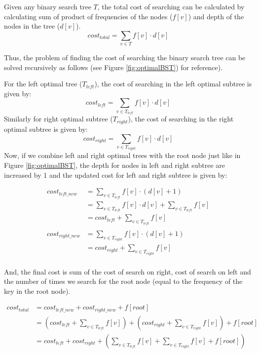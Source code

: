 \documentclass[11pt]{article}
\theoremstyle{definition}
\begin{document}
    Given any binary search tree $T$, the total cost of searching can be calculated by calculating sum of product of frequencies of the nodes ($f[v]$) and depth of the nodes in the tree ($d[v]$).
    \begin{equation}
        cost_{total} = \sum_{v \in T} f[v]\cdot d[v]
    \end{equation}
    
    Thus, the problem of finding the cost of searching the binary search tree can be solved recursively as follows (see Figure \ref{fig:optimalBST}) for reference).

For the left optimal tree ($T_{left}$), the cost of searching in the left optimal subtree is given by: 
    \begin{equation}
        cost_{left} = \sum_{v \in T_{left}} f[v]\cdot d[v]
    \end{equation}
    Similarly for right optimal subtree ($T_{right}$), the cost of searching in the right optimal subtree is given by:
    \begin{equation}
        cost_{right} = \sum_{v \in T_{right}} f[v]\cdot d[v]
    \end{equation}
    Now, if we combine left and right optimal trees with the root node just like in Figure \ref{fig:optimalBST}, the depth for nodes in left and right subtree are increased by 1 and the updated cost for left and right subtree is given by: 
    \begin{center}
        \begin{align*}
            cost_{left\_new} &= \sum_{v \in  T_{left}} f[v]\cdot (d[v] +1)\\
            &= \sum_{v \in  T_{left}} f[v]\cdot d[v] + \sum_{v \in  T_{left}} f[v]\\
            &= cost_{left} + \sum_{v \in  T_{left}} f[v]\\
            \\
            cost_{right\_new} &= \sum_{v \in  T_{right}} f[v]\cdot  (d[v] +1)\\
            &= cost_{right} + \sum_{v \in  T_{right}} f[v]\\
        \end{align*}
    \end{center}
    And, the final cost is sum of the cost of search on right, cost of search on left and the number of times we search for the root node (equal to the frequency of the key in the root node).
    \begin{center}
        \begin{align*}
            cost_{total} &= cost_{left\_new} + cost_{right\_new} + f[root]\\
            &= \left(cost_{left} + \sum_{v \in  T_{left}} f[v] \right)+ \left(cost_{right}   + \sum_{v \in  T_{right}} f[v]\right) + f[root] \\
            &= cost_{left} + cost_{right}   + \left(\sum_{v \in  T_{left}} f[v] + \sum_{v \in  T_{right}} f[v] + f[root]\right)
        \end{align*}
    \end{center}
    
\end{document}
